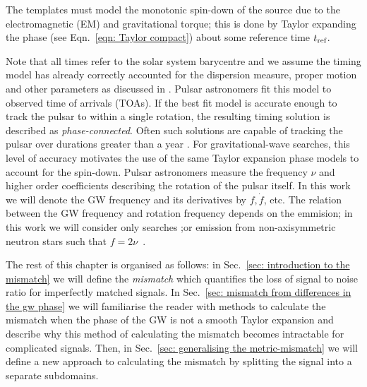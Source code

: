 \documentclass[../full_thesis/full_thesis.tex]{subfiles}
\begin{document}
The templates must model the monotonic spin-down of the source due to the
electromagnetic (EM) and gravitational torque; this is done by Taylor expanding
the phase (see Eqn.~\eqref{eqn: Taylor compact}) about some reference time
$t_{\textrm{ref}}$.

Note that all times refer to the solar system barycentre and we assume the
timing model has already correctly accounted for the dispersion measure, proper
motion and other parameters as discussed in \citet{Edwards2006}.  Pulsar
astronomers fit this model to observed time of arrivals (TOAs). If the best fit
model is accurate enough to track the pulsar to within a single rotation, the
resulting timing solution is described as \emph{phase-connected}.  Often such
solutions are capable of tracking the pulsar over durations greater than  a
year \citep{Lyne2012book}.  For gravitational-wave searches, this level of
accuracy motivates the use of the same Taylor expansion phase models to account
for the spin-down.  Pulsar astronomers measure the frequency $\nu$ and higher
order coefficients describing the rotation of the pulsar itself. In this work
we will denote the GW frequency and its derivatives by $f, \dot{f}$,
etc. The relation between the GW frequency and rotation frequency depends on
the emmision; in this work we will consider only searches ;or emission from
non-axisymmetric neutron stars such that $f=2\nu$~\citep{Shapiro83}.

The rest of this chapter is organised as follows: in Sec.~\ref{sec:
introduction to the mismatch} we will define the \emph{mismatch} which
quantifies the loss of signal to noise ratio for imperfectly matched signals.
In Sec.~\ref{sec: mismatch from differences in the gw phase} we will
familiarise the reader with methods to calculate the mismatch when the phase of
the GW is not a smooth Taylor expansion and describe why this method of
calculating the mismatch becomes intractable for complicated signals. Then, in
Sec.~\ref{sec: generalising the metric-mismatch} we will define a new approach
to calculating the mismatch by splitting the signal into a separate subdomains.
\end{document}
